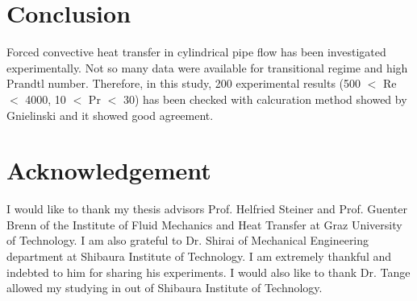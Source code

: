 \documentclass[conference]{IEEEtran}
\begin{document}

\section{Conclusion}
Forced convective heat transfer in cylindrical pipe flow has been investigated experimentally.
Not so many data were available for transitional regime and high Prandtl number.
Therefore, in this study, 200 experimental results (500 $<$ Re $<$ 4000, 10 $<$ Pr $<$ 30) has been checked with calcuration method showed by Gnielinski\cite{Gnienlinski2010} and it showed good agreement.

\section{Acknowledgement}
I would like to thank my thesis advisors Prof. Helfried
Steiner and Prof. Guenter Brenn of the Institute of Fluid Mechanics and Heat Transfer at Graz University of Technology.
I am also grateful to Dr. Shirai of Mechanical Engineering
department at Shibaura Institute of Technology. I am extremely
thankful and indebted to him for sharing his experiments. I
would also like to thank Dr. Tange allowed my studying in out of Shibaura Institute of Technology.
\\
\end{document}
